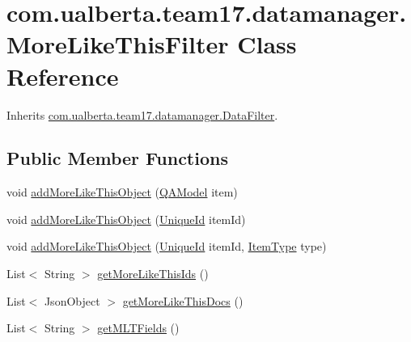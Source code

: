 \hypertarget{classcom_1_1ualberta_1_1team17_1_1datamanager_1_1_more_like_this_filter}{\section{com.\+ualberta.\+team17.\+datamanager.\+More\+Like\+This\+Filter Class Reference}
\label{classcom_1_1ualberta_1_1team17_1_1datamanager_1_1_more_like_this_filter}
}


Inherits \hyperlink{classcom_1_1ualberta_1_1team17_1_1datamanager_1_1_data_filter}{com.\+ualberta.\+team17.\+datamanager.\+Data\+Filter}.

\subsection*{Public Member Functions}
\begin{DoxyCompactItemize}
\item 
void \hyperlink{classcom_1_1ualberta_1_1team17_1_1datamanager_1_1_more_like_this_filter_a590091ed9254867012b285cd6d6278a5}{add\+More\+Like\+This\+Object} (\hyperlink{classcom_1_1ualberta_1_1team17_1_1_q_a_model}{Q\+A\+Model} item)
\item 
void \hyperlink{classcom_1_1ualberta_1_1team17_1_1datamanager_1_1_more_like_this_filter_a7a2a7bdf2b85de7356e3e6486042b994}{add\+More\+Like\+This\+Object} (\hyperlink{classcom_1_1ualberta_1_1team17_1_1_unique_id}{Unique\+Id} item\+Id)
\item 
void \hyperlink{classcom_1_1ualberta_1_1team17_1_1datamanager_1_1_more_like_this_filter_acc38fac67cd94e0769a8d225c6cb523a}{add\+More\+Like\+This\+Object} (\hyperlink{classcom_1_1ualberta_1_1team17_1_1_unique_id}{Unique\+Id} item\+Id, \hyperlink{enumcom_1_1ualberta_1_1team17_1_1_item_type}{Item\+Type} type)
\item 
List$<$ String $>$ \hyperlink{classcom_1_1ualberta_1_1team17_1_1datamanager_1_1_more_like_this_filter_aa0a45b48fdd256bcc49445b8d6589e86}{get\+More\+Like\+This\+Ids} ()
\item 
List$<$ Json\+Object $>$ \hyperlink{classcom_1_1ualberta_1_1team17_1_1datamanager_1_1_more_like_this_filter_afb2313d403420ac540a52e63d1529ae1}{get\+More\+Like\+This\+Docs} ()
\item 
List$<$ String $>$ \hyperlink{classcom_1_1ualberta_1_1team17_1_1datamanager_1_1_more_like_this_filter_aa20cef01f7b9438abfb172b5f813a098}{get\+M\+L\+T\+Fields} ()
\end{DoxyCompactItemize}
